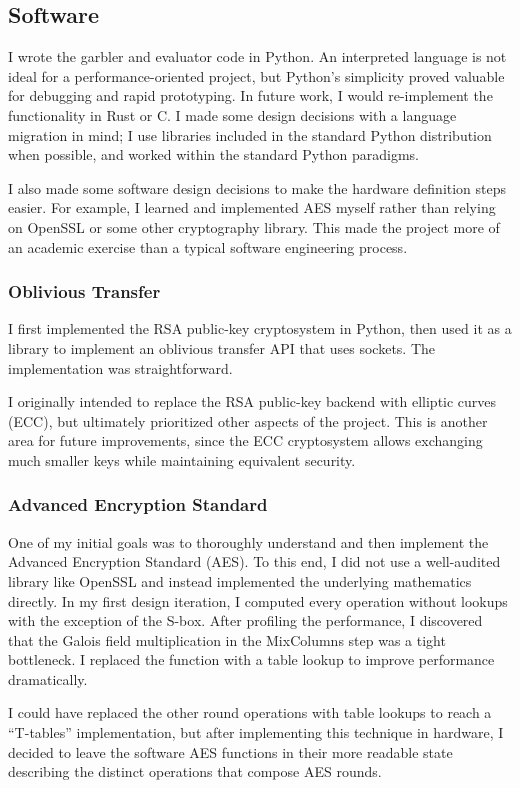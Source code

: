 \subsection{Software}
I wrote the garbler and evaluator code in Python. An interpreted language is not ideal for a performance-oriented project, but Python's simplicity proved valuable for debugging and rapid prototyping. In future work, I would re-implement the functionality in Rust or C. I made some design decisions with a language migration in mind; I use libraries included in the standard Python distribution when possible, and worked within the standard Python paradigms.

I also made some software design decisions to make the hardware definition steps easier. For example, I learned and implemented AES myself rather than relying on OpenSSL or some other cryptography library. This made the project more of an academic exercise than a typical software engineering process.

\subsubsection{Oblivious Transfer}
I first implemented the RSA public-key cryptosystem in Python, then used it as a library to implement an oblivious transfer API that uses sockets. The implementation was straightforward.

I originally intended to replace the RSA public-key backend with elliptic curves (ECC), but ultimately prioritized other aspects of the project. This is another area for future improvements, since the ECC cryptosystem allows exchanging much smaller keys while maintaining equivalent security.

\subsubsection{Advanced Encryption Standard}
One of my initial goals was to thoroughly understand and then implement the Advanced Encryption Standard (AES). To this end, I did not use a well-audited library like OpenSSL and instead implemented the underlying mathematics directly. In my first design iteration, I computed every operation without lookups with the exception of the S-box. After profiling the performance, I discovered that the Galois field multiplication in the MixColumns step was a tight bottleneck. I replaced the function with a table lookup to improve performance dramatically.

I could have replaced the other round operations with table lookups to reach a ``T-tables'' implementation, but after implementing this technique in hardware, I decided to leave the software AES functions in their more readable state describing the distinct operations that compose AES rounds.

